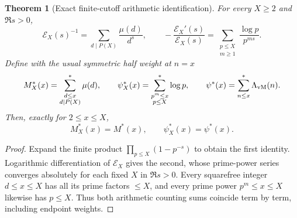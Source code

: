 \documentclass[11pt,reqno]{amsart}
\numberwithin{equation}{section}
\newtheorem{theorem}{Theorem}[section]
\begin{document}
\begin{theorem}[Exact finite-cutoff arithmetic identification]
\label{thm:Eulerarith}
For every $X\ge2$ and $\Re s>0$,
\begin{equation}\label{eq:EulerMcoeff}
 \mathscr E_X(s)^{-1}=\sum_{d\mid P(X)}\frac{\mu(d)}{d^s},
 \qquad
 -\frac{\mathscr E_X'(s)}{\mathscr E_X(s)}=
 \sum_{\substack{p\le X\\m\ge1}}\frac{\log p}{p^{ms}}.
\end{equation}
Define with the usual symmetric half weight at $n=x$
\[
 M_X^*(x)=\sum_{\substack{d\le x\\d\mid P(X)}}^{*}\mu(d),
\qquad
 \psi_X^*(x)=\sum_{\substack{p^m\le x\\p\le X}}^{*}\log p,\qquad\psi^*(x)=\sum_{n\le x}^{*}\Lambda_{\rm vM}(n).
\]
Then, exactly for $2\le x\le X$,
\begin{equation}\label{eq:arithidentity}
  M_X^*(x)=M^*(x),\qquad \psi_X^*(x)=\psi^*(x).
\end{equation}
\end{theorem}
\begin{proof}
Expand the finite product $\prod_{p\le X}(1-p^{-s})$ to obtain the
first identity.  Logarithmic differentiation of $\mathscr E_X$ gives the second,
whose prime-power series converges absolutely for each fixed $X$
in $\Re s>0$.  Every squarefree integer $d\le x\le X$ has all its
prime factors $\le X$, and every prime power $p^m\le x\le X$
likewise has $p\le X$. Thus both arithmetic counting sums coincide
term by term, including endpoint weights.
\end{proof}
\end{document}
